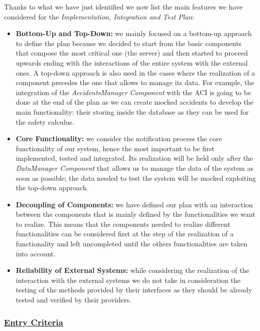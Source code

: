 		Thanks to what we have just identified we now list the main features we have considered for the \emph{Implementation, Integration and Test Plan}:
		
		\begin{itemize}
			\item \textbf{Bottom-Up and Top-Down:} we mainly focused on a bottom-up approach to define the plan because we decided to start from the basic components that compose the most critical one (the server) and then started to proceed upwards ending with the interactions of the entire system with the external ones. A top-down approach is also used in the cases where the realization of a component precedes the one that allows to manage its data. For example, the integration of the \emph{AccidentsManager Component} with the ACI is going to be done at the end of the plan as we can create mocked accidents to develop the main functionality: their storing inside the database as they can be used for the safety calculus.
			
			\item \textbf{Core Functionality:} we consider the notification process the core functionality of our system, hence the most important to be first implemented, tested and integrated. Its realization will be held only after the \emph{DataManager Component} that allows us to manage the data of the system as soon as possible; the data needed to test the system will be mocked exploiting the top-down approach.
			
			\item \textbf{Decoupling of Components:} we have defined our plan with an interaction between the components that is mainly defined by the functionalities we want to realize. This means that the components needed to realize different functionalities can be considered first at the step of the realization of a functionality and left uncompleted until the others functionalities are taken into account.
			
			\item \textbf{Reliability of External Systems:} while considering the realization of the interaction with the external systems we do not take in consideration the testing of the methods provided by their interfaces as they should be already tested and verified by their providers. 
		\end{itemize}
	
	\subsubsection[Entry Criteria]{\hyperlink{toc}{Entry Criteria}}
		\label{sec:entryCriteria}
		
